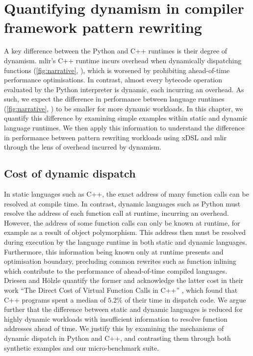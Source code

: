 \chapter{Quantifying dynamism in compiler framework pattern rewriting}
\label{chap:dynamism-pattern-rewriting}

A key difference between the Python and C++ runtimes is their degree of dynamism.
\ac{mlir}'s C++ runtime incurs overhead when dynamically dispatching functions (\autoref{fig:narrative}, ), which is worsened by prohibiting ahead-of-time performance optimisations. In contrast, almost every bytecode operation evaluated by the Python interpreter is dynamic, each incurring an overhead.
As such, we expect the difference in performance between language runtimes (\autoref{fig:narrative}, ) to be smaller for more dynamic workloads.
In this chapter, we quantify this difference by examining simple examples within static and dynamic language runtimes. We then apply this information to understand the difference in performance between pattern rewriting workloads using xDSL and \ac{mlir} through the lens of overhead incurred by dynamism.


\section{Cost of dynamic dispatch}
\label{sec:dynamism-pattern-rewriting-dispatch}

In static languages such as C++, the exact address of many function calls can be resolved at compile time. In contrast, dynamic languages such as Python must resolve the address of each function call at runtime, incurring an overhead.
However, the address of some function calls can only be known at runtime, for example as a result of object polymorphism. This address then must be resolved during execution by the language runtime in both static and dynamic languages. Furthermore, this information being known only at runtime presents and optimisation boundary, precluding common rewrites such as function inlining which contribute to the performance of ahead-of-time compiled languages.
Driesen and H\"olzle quantify the former and acknowledge the latter cost in their work ``The Direct Cost of Virtual Function Calls in C++'' \cite{driesenDirectCostVirtual1996}, which found that C++ programs spent a median of $5.2\%$ of their time in dispatch code.
We argue further that the difference between static and dynamic languages is reduced for highly dynamic workloads with insufficient information to resolve function addresses ahead of time.
We justify this by examining the mechanisms of dynamic dispatch in Python and C++, and contrasting them through both synthetic examples and our micro-benchmark suite.

